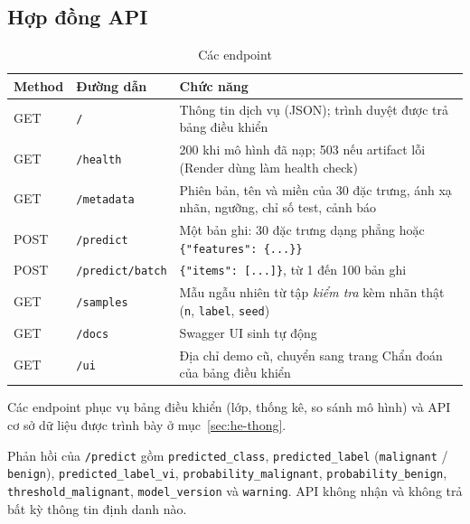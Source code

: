 \documentclass[12pt]{article}
\begin{document}
\subsection{Hợp đồng API}

\begin{table}[H]
\centering
\caption{Các endpoint}
\small
\begin{tabular}{@{}llp{}@{}}
\toprule
Method & Đường dẫn & Chức năng \\
\midrule
GET  & \texttt{/} & Thông tin dịch vụ (JSON); trình duyệt được trả bảng điều khiển \\
GET  & \texttt{/health} & 200 khi mô hình đã nạp; 503 nếu artifact lỗi (Render dùng làm health check) \\
GET  & \texttt{/metadata} & Phiên bản, tên và miền của 30 đặc trưng, ánh xạ nhãn, ngưỡng, chỉ số test, cảnh báo \\
POST & \texttt{/predict} & Một bản ghi: 30 đặc trưng dạng phẳng hoặc \texttt{\{"features": \{...\}\}} \\
POST & \texttt{/predict/batch} & \texttt{\{"items": [...]\}}, từ 1 đến 100 bản ghi \\
GET  & \texttt{/samples} & Mẫu ngẫu nhiên từ tập \emph{kiểm tra} kèm nhãn thật (\texttt{n}, \texttt{label}, \texttt{seed}) \\
GET  & \texttt{/docs} & Swagger UI sinh tự động \\
GET  & \texttt{/ui} & Địa chỉ demo cũ, chuyển sang trang Chẩn đoán của bảng điều khiển \\
\bottomrule
\end{tabular}
\end{table}

Các endpoint phục vụ bảng điều khiển (lớp, thống kê, so sánh mô hình) và API cơ sở dữ liệu được trình bày ở
mục~\ref{sec:he-thong}.

Phản hồi của \texttt{/predict} gồm \texttt{predicted\_class}, \texttt{predicted\_label} (\texttt{malignant} /
\texttt{benign}), \texttt{predicted\_label\_vi}, \texttt{probability\_malignant}, \texttt{probability\_benign},
\texttt{threshold\_malignant}, \texttt{model\_version} và \texttt{warning}. API không nhận và không trả bất kỳ thông
tin định danh nào.
\end{document}
